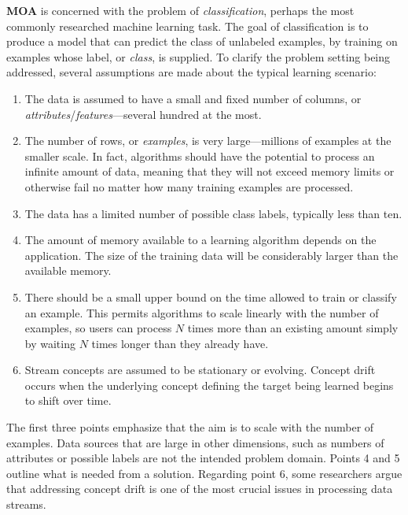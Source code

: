 \textbf{MOA} is concerned with the problem of {\em classification}, perhaps the most commonly researched machine learning task. The goal of classification is to produce a model that can predict the class of unlabeled examples, by training on examples whose label, or {\em class}, is supplied. To clarify the problem setting being addressed, several assumptions are made about the typical learning scenario: 
\begin{enumerate}
\item The data is assumed to have a small and fixed number of columns, or {\em attributes}/{\em features}---several hundred at the most. 
\item The number of rows, or {\em examples}, is very large---millions of examples at the smaller scale. 
In fact, algorithms should have the potential to process an infinite amount of data, meaning that they will not exceed memory limits or otherwise fail no matter how many training examples are processed.
\item The data has a limited number of possible class labels, typically less than ten.
\item The amount of memory available to a learning algorithm depends on the application. The size of the training data will be considerably larger than the available memory.
\item There should be a small upper bound on the time allowed to train or classify an example. This permits algorithms to scale linearly with the number of examples, so users can process $N$ times more than an existing amount simply by waiting $N$ times longer than they already have. 
\item Stream concepts are assumed to be stationary or evolving. %
Concept drift occurs when the underlying concept defining the target being learned begins to shift over time. %
\end{enumerate}

The first three points emphasize that the aim is to scale with the number of examples. Data sources that are large in other dimensions, such as numbers of attributes or possible labels are not the intended problem domain. Points 4 and 5 outline what is needed from a solution. Regarding point 6, some researchers argue that addressing concept drift is one of the most crucial issues in processing data streams. %


